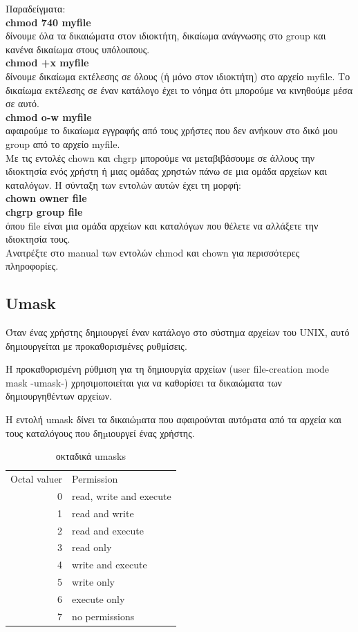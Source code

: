 Παραδείγματα:\\
\textbf{chmod 740 myfile}\\
δίνουμε όλα τα δικαιώματα στον ιδιοκτήτη, δικαίωμα ανάγνωσης στο group και κανένα δικαίωμα στους υπόλοιπους.\\
\textbf{chmod +x myfile} \\
δίνουμε δικαίωμα εκτέλεσης σε όλους (ή μόνο στον ιδιοκτήτη) στο αρχείο myfile. Το δικαίωμα εκτέλεσης σε έναν κατάλογο έχει το νόημα ότι
μπορούμε να κινηθούμε
μέσα σε αυτό.\\
\textbf{chmod o-w myfile}\\
αφαιρούμε το δικαίωμα εγγραφής από τους χρήστες που δεν ανήκουν στο δικό μου group από το αρχείο myfile.\\

Με τις εντολές chown και chgrp μπορούμε να μεταβιβάσουμε σε άλλους την ιδιοκτησία ενός χρήστη ή μιας ομάδας χρηστών πάνω σε μια ομάδα
αρχείων και καταλόγων. Η σύνταξη των εντολών αυτών έχει τη μορφή:\\
\textbf{chown owner file} \\
\textbf{chgrp group file} \\
όπου file είναι μια ομάδα αρχείων και καταλόγων που θέλετε να αλλάξετε την ιδιοκτησία τους.\\

Ανατρέξτε στο manual των εντολών chmod και chown για περισσότερες πληροφορίες.

\subsection*{Umask}

Όταν ένας χρήστης δημιουργεί έναν κατάλογο στο σύστημα αρχείων του UNIX, αυτό δημιουργείται με προκαθορισμένες ρυθμίσεις.

Η προκαθορισμένη ρύθμιση για τη δημιουργία αρχείων (user file-creation mode mask -umask-) χρησιμοποιείται για να καθορίσει τα δικαιώματα των δημιουργηθέντων αρχείων.


H εντολή umask δίνει τα δικαιώµατα που αφαιρούνται αυτόµατα από τα αρχεία και τους
καταλόγους που δηµιουργεί ένας χρήστης.

\begin{center}
	\begin{table}[h]
		\small
		\begin{tabularx}{\textwidth}{r|l}
			\rowcolor[gray]{0.9}
			Octal valuer	&	Permission \\
			0 & read, write and execute \\
			1 & read and write \\
			2 & read and execute \\
			3 & read only \\
			4 & write and execute \\
			5 & write only \\
			6 & execute only \\
			7 & no permissions \\
		\end{tabularx}  
		\caption{οκταδικά umasks} 
		\label{tab:operators}          
	\end{table}
\end{center}

